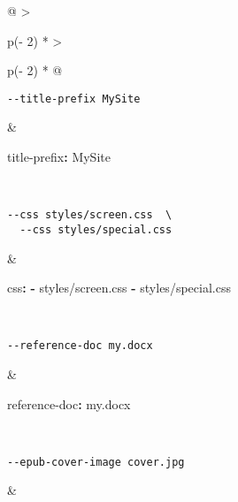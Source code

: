 \documentclass[
  a4paper,
]{article}
\newenvironment{Shaded}{}{}
\newcommand{\AttributeTok}[1]{\textcolor[rgb]{0.49,0.56,0.16}{#1}}
\newcommand{\FunctionTok}[1]{\textcolor[rgb]{0.02,0.16,0.49}{#1}}
\newcommand{\KeywordTok}[1]{\textcolor[rgb]{0.00,0.44,0.13}{\textbf{#1}}}
\begin{document}
\begin{longtable}[]{@{}
  >{\raggedright\arraybackslash}p{(\columnwidth - 2\tabcolsep) * }
  >{\raggedright\arraybackslash}p{(\columnwidth - 2\tabcolsep) * }@{}}
\begin{minipage}[t]{\linewidth}
\begin{verbatim}
--title-prefix MySite
\end{verbatim}
\end{minipage} & \begin{minipage}[t]{\linewidth}\raggedright
\begin{Shaded}
\begin{Highlighting}[]
\FunctionTok{title{-}prefix}\KeywordTok{:}\AttributeTok{ MySite}
\end{Highlighting}
\end{Shaded}
\end{minipage} \\
\begin{minipage}[t]{\linewidth}\raggedright
\begin{verbatim}
--css styles/screen.css  \
  --css styles/special.css
\end{verbatim}
\end{minipage} & \begin{minipage}[t]{\linewidth}\raggedright
\begin{Shaded}
\begin{Highlighting}[]
\FunctionTok{css}\KeywordTok{:}
\AttributeTok{  }\KeywordTok{{-}}\AttributeTok{ styles/screen.css}
\AttributeTok{  }\KeywordTok{{-}}\AttributeTok{ styles/special.css}
\end{Highlighting}
\end{Shaded}
\end{minipage} \\
\begin{minipage}[t]{\linewidth}\raggedright
\begin{verbatim}
--reference-doc my.docx
\end{verbatim}
\end{minipage} & \begin{minipage}[t]{\linewidth}\raggedright
\begin{Shaded}
\begin{Highlighting}[]
\FunctionTok{reference{-}doc}\KeywordTok{:}\AttributeTok{ my.docx}
\end{Highlighting}
\end{Shaded}
\end{minipage} \\
\begin{minipage}[t]{\linewidth}\raggedright
\begin{verbatim}
--epub-cover-image cover.jpg
\end{verbatim}
\end{minipage} & \begin{minipage}[t]{\linewidth}\raggedright

\end{minipage}
\end{longtable}
\end{document}
